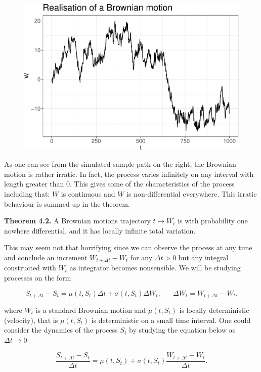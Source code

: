 \documentclass[
]{article}
\begin{document}
\begin{figure}\includegraphics{FinKont_homework_files/figure-latex/unnamed-chunk-3-1}\end{figure}

As one can see from the simulated sample path on the right, the Brownian
motion is rather irratic. In fact, the process varies infinitely on any
interval with length greater than 0. This gives some of the
characteristics of the process including that: \(W\) is continuous and
\(W\) is non-differential everywhere. This irratic behaviour is summed
up in the theorem.

\textbf{Theorem 4.2.} A Brownian motions trajectory \(t\mapsto W_t\) is
with probability one nowhere differential, and it has locally infinite
total variation.

This may seem not that horrifying since we can observe the process at
any time and conclude an increment \(W_{t+\Delta t}-W_t\) for any
\(\Delta t>0\) but any integral constructed with \(W_t\) as integrator
becomes nonsensible. We will be studying processes on the form

\[S_{t+\Delta t}-S_t=\mu(t,S_t)\Delta t+\sigma(t,S_t)\Delta W_t,\hspace{20pt}\Delta W_t=W_{t+\Delta t}-W_t.\]

where \(W_t\) is a standard Brownian motion and \(\mu(t,S_t)\) is
locally deterministic (velocity), that is \(\mu(t,S_t)\) is
deterministic on a small time interval. One could consider the dynamics
of the process \(S_t\) by studying the equation below as
\(\Delta t\to 0_+\)

\[\frac{S_{t+\Delta t}-S_t}{\Delta t}=\mu(t,S_t)+\sigma(t,S_t)\frac{W_{t+\Delta t}-W_t}{\Delta t}.\]
\end{document}
